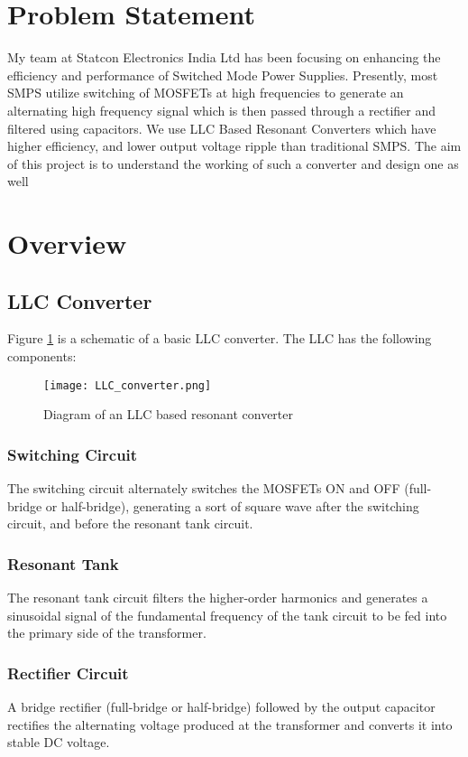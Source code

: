 
\section{Problem Statement}
My team at Statcon Electronics India Ltd has been focusing on enhancing the
efficiency and performance of Switched Mode Power Supplies. Presently, most
SMPS utilize switching of MOSFETs at high frequencies to generate an alternating
high frequency signal which is then passed through a rectifier and filtered using
capacitors. We use LLC Based Resonant Converters which have higher efficiency, and
lower output voltage ripple than traditional SMPS. The aim of this project is to
understand the working of such a converter and design one as well

\section{Overview}

\subsection{LLC Converter}
Figure \ref{fig:llc_converter} is a schematic of a basic LLC converter. The LLC has the
following components:

\begin{figure}[h]
    \centering
    \texttt{[image: LLC\_converter.png]}
    \caption{Diagram of an LLC based resonant converter}
    \label{fig:llc_converter}
\end{figure}

\noindent

\subsubsection{Switching Circuit}
The switching circuit alternately switches the MOSFETs ON and OFF (full-bridge or half-bridge), generating a sort of square wave after the switching circuit, and before the resonant tank circuit.
\subsubsection{Resonant Tank}
The resonant tank circuit filters the higher-order harmonics and generates a sinusoidal signal of the fundamental frequency of the tank circuit to be fed into the primary side of the transformer.
\subsubsection{Rectifier Circuit}
A bridge rectifier (full-bridge or half-bridge) followed by the output capacitor rectifies the alternating voltage produced at the transformer and converts it into stable DC voltage.

